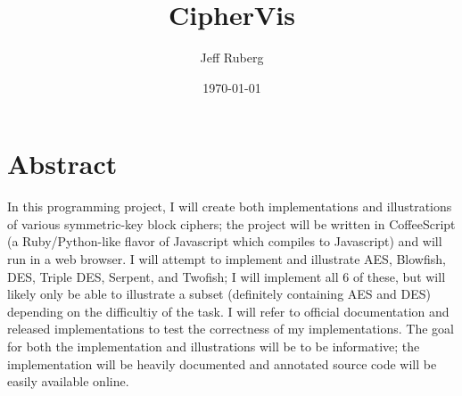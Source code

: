 \documentclass[11pt,letterpaper]{article}
\title{CipherVis}
\date{\today}
\author{Jeff Ruberg}
\begin{document}
\maketitle

\section{Abstract}

In this programming project, I will create both implementations and
illustrations of various symmetric-key block ciphers; the project will be
written in CoffeeScript (a Ruby/Python-like flavor of Javascript which compiles
to Javascript) and will run in a web browser. I will attempt to implement and
illustrate AES, Blowfish, DES, Triple DES, Serpent, and Twofish; I will
implement all 6 of these, but will likely only be able to illustrate a subset
(definitely containing AES and DES) depending on the difficultiy of the task. I
will refer to official documentation and released implementations to test the
correctness of my implementations. The goal for both the implementation and
illustrations will be to be informative; the implementation will be heavily
documented and annotated source code will be easily available online.
\end{document}
